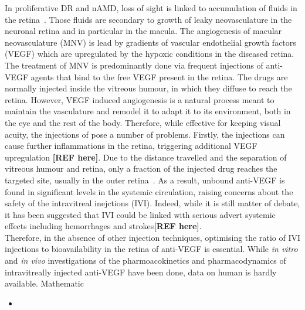 \documentclass[12pt,a4paper]{article}
\begin{document}
In proliferative DR and nAMD, loss of sight is linked to accumulation of fluids in the retina~\cite{Waldstein_2016, Roberts_2020}.
Those fluids are secondary to growth of leaky neovasculature in the neuronal retina and in particular in the macula.
The angiogenesis of macular neovasculature (MNV) is lead by gradients of vascular endothelial growth factors (VEGF) which are upregulated by the hypoxic conditions in the diseased retina.
The treatment of MNV is predominantly done via frequent injections of anti-VEGF agents that bind to the free VEGF present in the retina.
The drugs are normally injected inside the vitreous humour, in which they diffuse to reach the retina.
However, VEGF induced angiogenesis is a natural process meant to maintain the vasculature and remodel it to adapt it to its environment, both in the eye and the rest of the body.
Therefore, while effective for keeping visual acuity, the injections of pose a number of problems.
Firstly, the injections can cause further inflammations in the retina, triggering additional VEGF upregulation \textbf{[REF here]}.
Due to the distance travelled and the separation of vitreous humour and retina, only a fraction of the injected drug reaches the targeted site, usually in the outer retina~\cite{park_intraocular_2015}.
As a result, unbound anti-VEGF is found in significant levels in the systemic circulation, raising concerns about the safety of the intravitreal inejctions (IVI).
Indeed, while it is still matter of debate, it has been suggested that IVI could be linked with serious advert systemic effects including hemorrhages and strokes\textbf{[REF here]}. \\
Therefore, in the absence of other injection techniques, optimising the ratio of IVI injections to bioavailability in the retina of anti-VEGF is essential.
While \textit{in vitro} and \textit{in vivo} investigations of the pharmoacokinetics and pharmacodynamics of intravitreally injected anti-VEGF have been done, data on human is hardly available.
Mathematic




\begin{itemize}
\item 
\end{itemize}


{\normalsize }
\end{document}
